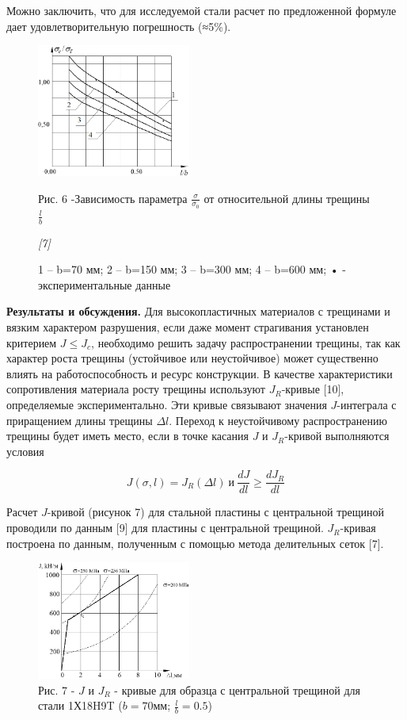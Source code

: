Можно заключить, что для исследуемой стали расчет по предложенной
формуле дает удовлетворительную погрешность (≈5\%).

\begin{figure}[H]
	\centering
	\includegraphics[width=0.45\textwidth]{assets/1192}
	\caption*{Рис. 6 -Зависимость параметра $\frac{\sigma}{\sigma_{0}}$ от относительной длины трещины $\frac{l}{b}$}
	\caption*{1 -- b=70 мм; 2 -- b=150 мм; 3 -- b=300 мм; 4 -- b=600 мм; • - экспериментальные данные} \emph{{[}7{]}}
\end{figure}

\begin{multicols}{2}
{\bfseries Результаты и обсуждения.} Для высокопластичных материалов с
трещинами и вязким характером разрушения, если даже момент страгивания
установлен критерием $J\leq J_{c}$, необходимо
решить задачу распространении трещины, так как характер роста трещины
(устойчивое или неустойчивое) может существенно влиять на
работоспособность и ресурс конструкции. В качестве характеристики
сопротивления материала росту трещины используют
$J_{R}$-кривые {[}10{]}, определяемые
экспериментально. Эти кривые связывают значения
$J$-интеграла с приращением длины
трещины $\Delta l$. Переход к неустойчивому
распространению трещины будет иметь место, если в точке касания
$J$ и
$J_{R}$-кривой выполняются условия

\begin{equation}
J(\sigma, l) = J_{R}(\Delta l)\ \text{и}\ \frac{dJ}{dl} \geq \frac{dJ_{R}}{dl}
\end{equation}

Расчет $J$-кривой (рисунок 7) для стальной пластины с центральной
трещиной проводили по данным {[}9{]} для пластины с центральной
трещиной. $J_{R}$-кривая построена по
данным, полученным с помощью метода делительных сеток {[}7{]}.
\end{multicols}

\begin{figure}[H]
	\centering
	\includegraphics[width=0.45\textwidth]{assets/1204}
	\caption*{Рис. 7 - $J$ и $J_{R}$ - кривые для образца с центральной трещиной для стали 1Х18H9T ($b=70$мм; $\frac{l}{b}=0.5$)}
\end{figure}

